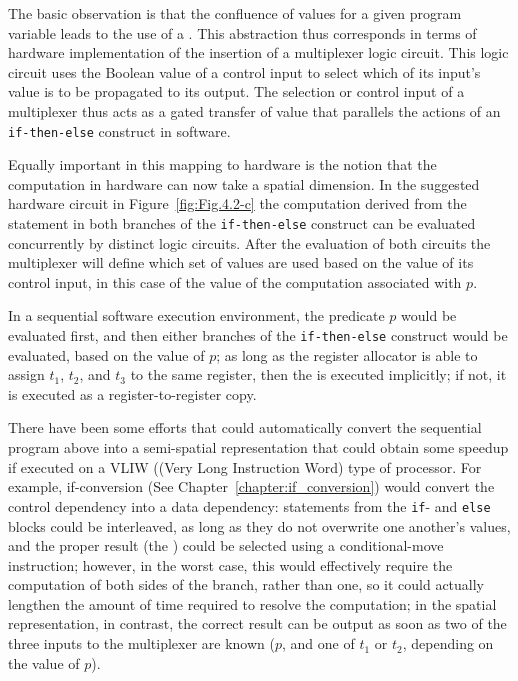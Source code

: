 The basic observation is that the confluence of values for a given
program variable leads to the use of a \phifun.
This \phifun abstraction thus corresponds in terms
of hardware implementation of the insertion of a multiplexer logic circuit. 
This logic circuit uses the Boolean value of a control input to select which of its 
input's value is to be propagated to its output. The selection or control input of 
a multiplexer thus acts as a gated transfer of value that parallels the actions of 
an {\tt if-then-else} construct in software.

Equally important in this mapping to hardware is the notion that the computation in hardware can now take a spatial dimension. 
In the suggested hardware circuit in Figure~\ref{fig:Fig.4.2-c} the computation derived from the statement in both branches of the {\tt if-then-else} construct can be evaluated concurrently by distinct logic circuits. 
After the evaluation of both circuits the multiplexer will define which set of values are used based on the value of its control input, in this case of the value of the computation associated with $p$.

In a sequential software execution environment, the predicate $p$ would be evaluated first, and then either branches of the {\tt if-then-else} construct would be evaluated, based on the value of $p$; 
as long as the register allocator is able to assign $t_1$, $t_2$, and $t_3$ to the same register, then the \phifun is executed implicitly; 
if not, it is executed as a register-to-register copy.

There have been some efforts that could automatically convert the sequential program above into a semi-spatial representation that could obtain some speedup if executed on a VLIW ((Very Long Instruction Word) type of processor. 
For example, if-conversion (See Chapter~\ref{chapter:if_conversion}) would convert the control dependency into a data dependency: 
statements from the {\tt if}- and {\tt else} blocks could be interleaved, as long as they do not overwrite one another's values, and the proper result (the \phifun) could be selected using a conditional-move instruction; 
however, in the worst case, this would effectively require the computation of both sides of the branch, rather than one, so it could actually lengthen the amount of time required to resolve the computation; 
in the spatial representation, in contrast, the correct result can be output as soon as two of the three inputs to the multiplexer are known ($p$, and one of $t_1$ or $t_2$, depending on the value of $p$).

